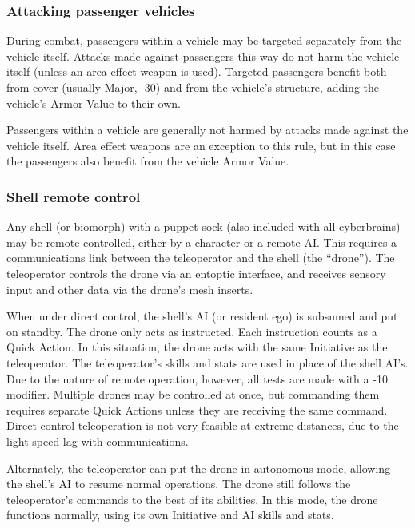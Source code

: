 \subsubsection{Attacking passenger vehicles}

During combat, passengers within a vehicle may be targeted separately from the vehicle itself. Attacks made against passengers this way do not harm the vehicle itself (unless an area effect weapon is used). Targeted passengers benefit both from cover (usually Major, -30) and from the vehicle’s structure, adding the vehicle’s Armor Value to their own.

Passengers within a vehicle are generally not harmed by attacks made against the vehicle itself. Area effect weapons are an exception to this rule, but in this case the passengers also benefit from the vehicle Armor Value.

\subsubsection{Shell remote control}

Any shell (or biomorph) with a puppet sock (also included with all cyberbrains) may be remote controlled, either by a character or a remote AI. This requires a communications link between the teleoperator and the shell (the ``drone”). The teleoperator controls the drone via an entoptic interface, and receives sensory input and other data via the drone’s mesh inserts.

When under direct control, the shell’s AI (or resident ego) is subsumed and put on standby. The drone only acts as instructed. Each instruction counts as a Quick Action. In this situation, the drone acts with the same Initiative as the teleoperator. The teleoperator’s skills and stats are used in place of the shell AI’s. Due to the nature of remote operation, however, all tests are made with a -10 modifier. Multiple drones may be controlled at once, but commanding them requires separate Quick Actions unless they are receiving the same command. Direct control teleoperation is not very feasible at extreme distances, due to the light-speed lag with communications.

Alternately, the teleoperator can put the drone in autonomous mode, allowing the shell’s AI to resume normal operations. The drone still follows the teleoperator’s commands to the best of its abilities. In this mode, the drone functions normally, using its own Initiative and AI skills and stats.

